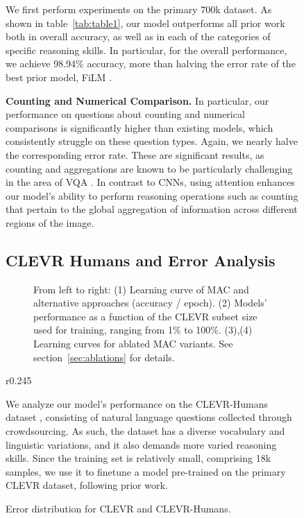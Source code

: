 \documentclass[fleqn]{article}
\newcommand{\tabref}[1]{table~\ref{tab:#1}}
\newcommand{\secref}[1]{section~\ref{sec:#1}}
\begin{document}
\begin{figure}[t]
\begin{minipage}{0.55\textwidth}
We first perform experiments on the primary 700k dataset. As shown in \tabref{table1}, our model outperforms all prior work both in overall accuracy, as well as in each of the categories of specific reasoning skills. In particular, for the overall performance, we achieve 98.94\% accuracy, more than halving the error rate of the best prior model, FiLM \citep{film}.

\textbf{Counting and Numerical Comparison.} In particular, our performance on questions about counting and numerical comparisons is significantly higher than existing models, which consistently struggle on these question types. Again, we nearly halve the corresponding error rate. These are significant results, as counting and aggregations are known to be particularly challenging in the area of VQA \citep{counting}. In contrast to CNNs, using attention enhances our model's ability to perform reasoning operations such as counting that pertain to the global aggregation of information across different regions of the image. 

\subsection{CLEVR Humans and Error Analysis}

\begin{figure}
\centering
{}
\hfill
{}
\hfill
{}
\hfill
{}
\caption{From left to right: (1) Learning curve of MAC and alternative approaches (accuracy / epoch). (2) Models' performance as a function of the CLEVR subset size used for training, ranging from 1\% to 100\%. (3),(4) Learning curves for ablated MAC variants. See \secref{ablations} for details. }
\label{fig:plots}
\end{figure}

\begin{wrapfigure}[19]{r}{0.245\textwidth}
\centering
\vspace{-8mm}
\centering
{}
\vspace*{-3mm}

\caption{Error distribution for CLEVR and CLEVR-Humans.}
\label{fig:error_dist}

\end{wrapfigure}
We analyze our model's performance on the CLEVR-Humans dataset \citep{pgee}, consisting of natural language questions collected through crowdsourcing. As such, the dataset has a diverse vocabulary and linguistic variations, and it also demands more varied reasoning skills. Since the training set is relatively small, comprising 18k samples, we use it to finetune a model pre-trained on the primary CLEVR dataset, following prior work. 


\end{minipage}
\end{figure}
\end{document}
